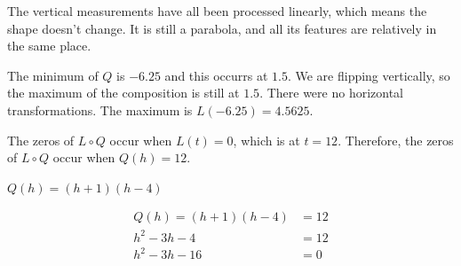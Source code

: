 \documentclass{ximera}
\begin{document}
\begin{image}
\end{image}

The vertical measurements have all been processed linearly, which means the shape doesn't change.  It is still a parabola, and all its features are relatively in the same place.



The minimum of $Q$ is $-6.25$ and this occurrs at $1.5$. We are flipping vertically, so the maximum of the composition is still at $1.5$. There were no horizontal transformations.  The maximum is $L(-6.25) = 4.5625$.




The zeros of $L \circ Q$ occur when $L(t) = 0$, which is at $t = 12$.  Therefore, the zeros of $L \circ Q$ occur when $Q(h) = 12$.





$Q(h) = (h+1)(h-4)$



\begin{align*}
Q(h) = (h+1)(h-4)     &  = 12  \\
h^2 - 3h - 4      & = 12   \\
h^2 - 3h - 16 & = 0  
\end{align*}
\end{document}
